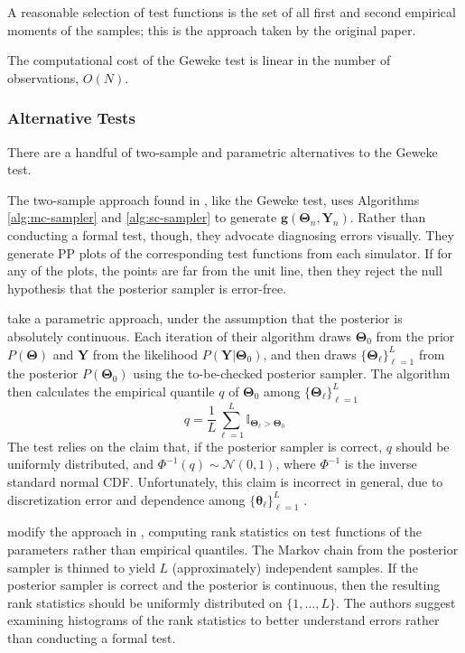 \documentclass[a4paper,11pt]{article}
\begin{document}
A reasonable selection of test functions is the set of all first and second empirical moments of the samples; this is the approach taken by the original paper.

The computational cost of the Geweke test is linear in the number of observations, $O(N)$.

\subsubsection{Alternative Tests}
There are a handful of two-sample and parametric alternatives to the Geweke test.

The two-sample approach found in \cite{grosse_testing_2014}, like the Geweke test, uses Algorithms \ref{alg:mc-sampler} and \ref{alg:sc-sampler} to generate $\mathbf{g}(\mathbf{\Theta}_{n}, \mathbf{Y}_{n})$. Rather than conducting a formal test, though, they advocate diagnosing errors visually. They generate PP plots of the corresponding test functions from each simulator. If for any of the plots, the points are far from the unit line, then they reject the null hypothesis that the posterior sampler is error-free.

\cite{cook_validation_2006} take a parametric approach, under the assumption that the posterior is absolutely continuous. Each iteration of their algorithm draws $\mathbf{\Theta}_{0}$ from the prior $P(\mathbf{\Theta})$ and $\mathbf{Y}$ from the likelihood $P(\mathbf{Y}|\mathbf{\Theta}_{0})$, and then draws $\{\mathbf{\Theta}_{\ell}\}_{\ell=1}^{L}$ from the posterior $P(\mathbf{\Theta}_{0})$ using the to-be-checked posterior sampler. The algorithm then calculates the empirical quantile $q$ of $\mathbf{\Theta}_{0}$ among $\{\mathbf{\Theta}_{\ell}\}_{\ell=1}^{L}$
$$
q = \frac{1}{L} \sum_{\ell=1}^{L} \mathbb{I}_{\mathbf{\Theta}_{\ell} > \mathbf{\Theta}_{0}}
$$
The test relies on the claim that, if the posterior sampler is correct, $q$ should be uniformly distributed, and $\Phi^{-1}(q) \sim \mathcal{N}(0,1)$, where $\Phi^{-1}$ is the inverse standard normal CDF. Unfortunately, this claim is incorrect in general, due to discretization error and dependence among $\{\mathbf{\theta}_{\ell}\}_{\ell=1}^{L}$ \cite{gelman_correction_2017}.

\cite{talts_validating_2018} modify the approach in \cite{cook_validation_2006}, computing rank statistics on test functions of the parameters rather than empirical quantiles. The Markov chain from the posterior sampler is thinned to yield $L$ (approximately) independent samples. If the posterior sampler is correct and the posterior is continuous, then the resulting rank statistics should be uniformly distributed on $\{1, \ldots, L\}$. The authors suggest examining histograms of the rank statistics to better understand errors rather than conducting a formal test.
\end{document}
